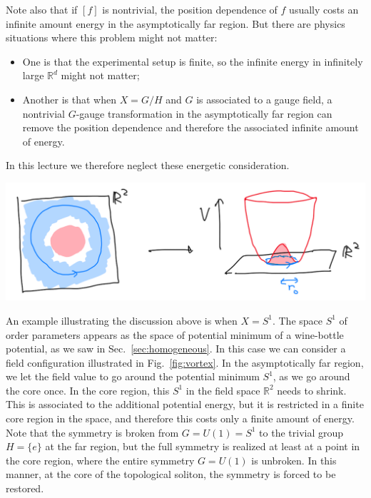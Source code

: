 \documentclass[12pt]{article}
\numberwithin{equation}{section}
\renewenvironment{figure}[1][]{
  \begin{originalfigure}[#1]
    \begin{mdframed}[linecolor=black!0,backgroundcolor=black!1]
}{
    \end{mdframed}
  \end{originalfigure}
}
\def\bR{\mathbb{R}}
\begin{document}
Note also that if $[f]$ is nontrivial,
the position dependence of $f$ usually costs an infinite amount energy in the asymptotically far region.
But there are physics situations where this problem might not matter:
\begin{itemize}
\item One is that the experimental setup is finite, so the infinite energy in infinitely large $\bR^d$ might not matter;
\item Another is that when $X=G/H$ and $G$ is associated to a gauge field,
a nontrivial $G$-gauge transformation in the asymptotically far region can remove the position dependence
and therefore the associated infinite amount of energy.
\end{itemize}
In this lecture we therefore neglect these energetic consideration.

\begin{figure}[h]
\centering
\includegraphics[width=.7\textwidth]{vortex.png}
\caption{A vortex configuration. 
In the asymptotic region, the field values are at the bottom of the potential.
In the core region, the field values come to the origin of the field space.}
\label{fig:vortex}
\end{figure}

An example illustrating the discussion above is when $X=S^1$.
The space $S^1$ of order parameters appears as the space of potential minimum of a wine-bottle potential, as we saw in Sec.~\ref{sec:homogeneous}.
In this case we can consider a field configuration illustrated in Fig.~\ref{fig:vortex}.
In the asymptotically far region, we let the field value  to go around the potential minimum $S^1$,
as we go around the core once. 
In the core region, this $S^1$ in the field space $\bR^2$ needs to shrink. 
This is associated to the additional potential energy, but it is restricted in a finite core region in the space,
and therefore this costs only a finite amount of energy.
Note that the symmetry is broken from $G=U(1)=S^1$ to the trivial group $H=\{e\}$ at the far region,
but the full symmetry is realized at least at a point in the core region,
where the entire  symmetry $G=U(1)$ is unbroken.
In this manner, at the core of the topological soliton, the symmetry is forced to be restored. 
\end{document}
